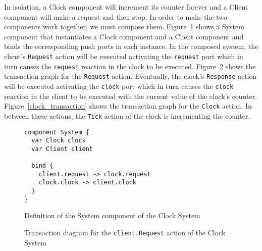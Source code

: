 In isolation, a Clock component will increment its counter forever and a Client component will make a request and then stop.
In order to make the two components work together, we must compose them.
Figure~\ref{system_component} shows a System component that instantiates a Clock component and a Client component and binds the corresponding push ports in each instance.
In the composed system, the client's \verb+Request+ action will be executed activating the \verb+request+ port which in turn causes the \verb+request+ reaction in the clock to be executed.
Figure~\ref{request_transaction} shows the transaction graph for the \verb+Request+ action.
Eventually, the clock's \verb+Response+ action will be executed activating the \verb+clock+ port which in turn causes the \verb+clock+ reaction in the client to be executed with the current value of the clock's counter.
Figure~\ref{clock_transaction} shows the transaction graph for the \verb+Clock+ action.
In between these actions, the \verb+Tick+ action of the clock is incrementing the counter.

\begin{figure}
\begin{verbatim}
component System {
  var Clock clock
  var Client client

  bind {
    client.request -> clock.request
    clock.clock -> client.clock
  }
}
\end{verbatim}
\caption{Definition of the System component of the Clock System}
\label{system_component}
\end{figure}

\begin{figure}
\centering
\begingroup
\fontsize{10pt}{12pt}\selectfont
{}
\endgroup
\cprotect\caption{Transaction diagram for the \verb+client.Request+ action of the Clock System}
\label{request_transaction}
\end{figure}

